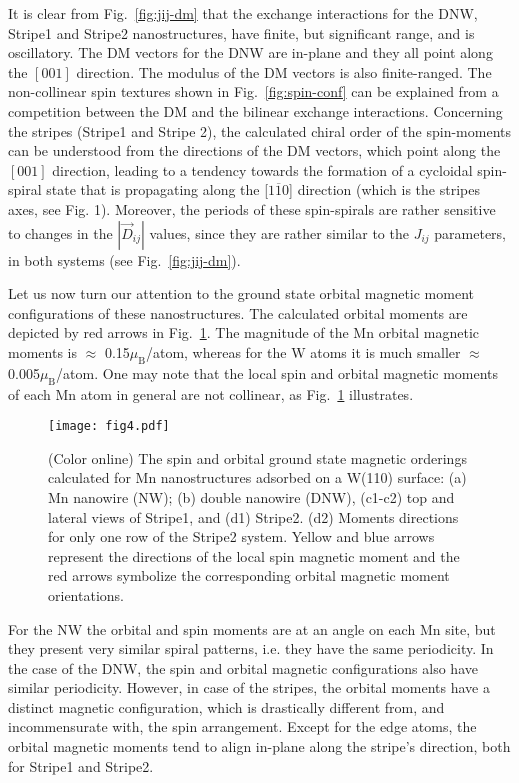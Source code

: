 \documentclass[prl,final,twocolumn]{revtex4-1}
\begin{document}
It is clear from Fig.~\ref{fig:jij-dm} that the exchange interactions for the DNW, Stripe1 and Stripe2 nanostructures, have finite, but significant range, and is oscillatory. 
The DM vectors for the DNW are in-plane and they all point along the $[001]$ direction. The modulus of the DM vectors is also finite-ranged. The non-collinear spin textures shown in Fig.~\ref{fig:spin-conf} can be explained from a competition between the DM and the bilinear exchange interactions. 
%
Concerning the stripes (Stripe1 and Stripe 2), the calculated chiral order of the spin-moments can be understood from the directions of the DM vectors, which point along the $[001]$ direction,  leading to a tendency towards the formation of a cycloidal spin-spiral state 
%  
that is propagating along the [$1\overline{1}0$] direction (which is the stripes axes, see Fig. 1).
Moreover, the periods of these spin-spirals are rather sensitive to changes in the $|\vec{D}_{ij}|$ values, since they are rather similar to the $J_{ij}$ parameters, in both systems (see Fig.~\ref{fig:jij-dm}).
 
%  
Let us now turn our attention to the ground state orbital magnetic moment configurations of these nanostructures. The calculated orbital moments are depicted by red arrows in Fig.~\ref{fig:orbit-conf}.
% 
The magnitude of the Mn orbital magnetic moments is $\approx$ 0.15$\mu_\text{B}$/atom, 
%  
whereas for the W atoms it is much smaller $\approx$ 0.005$\mu_\text{B}$/atom. 
One may note that the local spin and orbital magnetic moments of each Mn atom in general are not collinear, as Fig.~\ref{fig:orbit-conf} illustrates. 
\begin{figure}[htp]
\centering
\texttt{[image: fig4.pdf]}
\caption{(Color online) The spin and orbital ground state magnetic orderings calculated for Mn nanostructures adsorbed on a W(110) surface:
(a) Mn nanowire (NW); (b) double nanowire (DNW), (c1-c2) top and lateral views of Stripe1, and (d1) Stripe2. (d2) Moments directions for only one row of the Stripe2 system. 
Yellow and blue arrows represent the directions of the local spin magnetic moment and the red arrows symbolize the corresponding orbital magnetic moment orientations.
}
\label{fig:orbit-conf}
\end{figure}
For the NW the orbital and spin moments are at an angle on each Mn site, but they present very similar spiral patterns, i.e. they have the same periodicity. In the case of the DNW, the spin and orbital magnetic configurations also have similar periodicity. However, in case of the stripes, the orbital moments have a distinct magnetic configuration, which is drastically different from, and incommensurate with, the spin arrangement. Except for the edge atoms, the orbital magnetic moments tend to align in-plane along the stripe's direction, both for Stripe1 and Stripe2.
\end{document}
